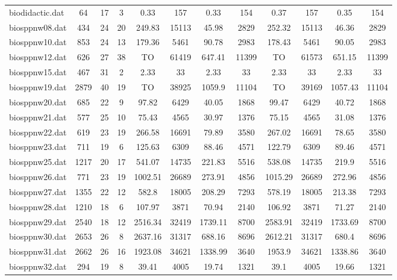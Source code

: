 \begin{sidewaystable}[!ht]
{\begin{tabular}{lccccccccccc}
biodidactic.dat & 64 & 17 & 3 & 0.33 & 157 & 0.33 & 154 & 0.37 & 157 & 0.35 & 154 \\
biosppnw08.dat & 434 & 24 & 20 & 249.83 & 15113 &  \textcolor{blue2}{45.98} & 2829 & 252.32 & 15113 & 46.36 & 2829 \\
biosppnw10.dat & 853 & 24 & 13 & 179.36 & 5461 & 90.78 & 2983 & 178.43 & 5461 &  \textcolor{blue2}{90.05} & 2983 \\
biosppnw12.dat & 626 & 27 & 38 &  TO & 61419 &  \textcolor{blue2}{647.41} & 11399 &  TO & 61573 & 651.15 & 11399 \\
biosppnw15.dat & 467 & 31 & 2 & 2.33 & 33 & 2.33 & 33 & 2.33 & 33 & 2.33 & 33 \\
biosppnw19.dat & 2879 & 40 & 19 &  TO & 38925 & 1059.9 & 11104 &  TO & 39169 & 1057.43 & 11104 \\
biosppnw20.dat & 685 & 22 & 9 & 97.82 & 6429 & 40.05 & 1868 & 99.47 & 6429 & 40.72 & 1868 \\
biosppnw21.dat & 577 & 25 & 10 & 75.43 & 4565 &  \textcolor{blue2}{30.97} & 1376 & 75.15 & 4565 & 31.08 & 1376 \\
biosppnw22.dat & 619 & 23 & 19 & 266.58 & 16691 & 79.89 & 3580 & 267.02 & 16691 & 78.65 & 3580 \\
biosppnw23.dat & 711 & 19 & 6 & 125.63 & 6309 &  \textcolor{blue2}{88.46} & 4571 & 122.79 & 6309 & 89.46 & 4571 \\
biosppnw25.dat & 1217 & 20 & 17 & 541.07 & 14735 & 221.83 & 5516 & 538.08 & 14735 &  \textcolor{blue2}{219.9} & 5516 \\
biosppnw26.dat & 771 & 23 & 19 & 1002.51 & 26689 & 273.91 & 4856 & 1015.29 & 26689 &  \textcolor{blue2}{272.96} & 4856 \\
biosppnw27.dat & 1355 & 22 & 12 & 582.8 & 18005 &  \textcolor{blue2}{208.29} & 7293 & 578.19 & 18005 & 213.38 & 7293 \\
biosppnw28.dat & 1210 & 18 & 6 & 107.97 & 3871 &  \textcolor{blue2}{70.94} & 2140 & 106.92 & 3871 & 71.27 & 2140 \\
biosppnw29.dat & 2540 & 18 & 12 & 2516.34 & 32419 & 1739.11 & 8700 & 2583.91 & 32419 &  \textcolor{blue2}{1733.69} & 8700 \\
biosppnw30.dat & 2653 & 26 & 8 & 2637.16 & 31317 & 688.16 & 8696 & 2612.21 & 31317 & 680.4 & 8696 \\
biosppnw31.dat & 2662 & 26 & 16 & 1923.08 & 34621 & 1338.99 & 3640 & 1953.9 & 34621 & 1338.86 & 3640 \\
biosppnw32.dat & 294 & 19 & 8 & 39.41 & 4005 & 19.74 & 1321 & 39.1 & 4005 &  \textcolor{blue2}{19.66} & 1321 \\

\end{tabular}}
\end{sidewaystable}
